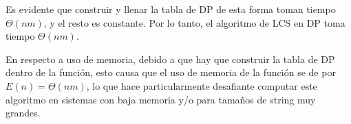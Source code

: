 Es evidente que construir y llenar la tabla de DP de esta forma toman tiempo $\Theta(nm)$, y el resto es constante. Por lo tanto, el algoritmo de LCS en DP toma tiempo $\Theta(nm)$.

En respecto a uso de memoria, debido a que hay que construir la tabla de DP dentro de la función, esto causa que el uso de memoria de la función se de por $E(n) = \Theta(nm)$, lo que hace particularmente desafiante computar este algoritmo en sistemas con baja memoria y/o para tamaños de string muy grandes.